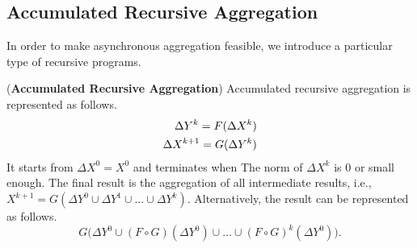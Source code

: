 \subsection{Accumulated Recursive Aggregation}
\label{sec:async:accrec}

In order to make asynchronous aggregation feasible, we introduce a particular type of recursive programs.

\begin{definition}
	\label{def:accumasync}
	(\textbf{Accumulated Recursive Aggregation}) Accumulated recursive aggregation is represented as follows.
	\begin{equation}\label{eq:accumasync}
	\begin{aligned}
	\Delta Y^{k}= F(\Delta X^k)\notag\\
	\Delta X^{k+1}= G(\Delta Y^{k})\notag
	\end{aligned}
	\end{equation}
	It starts from $\Delta X^0=X^0$ and terminates when The norm of $\Delta X^k$ is 0 or small enough. The final result is the aggregation of all intermediate results, i.e., $X^{k+1}=G(\Delta Y^{0} \cup \Delta Y^{1} \cup \ldots \cup \Delta Y^{k})$. Alternatively, the result can be represented as follows.
	\begin{equation}
	\label{eq:accumasyncres}
	G\Big(\Delta Y^0\cup (F\circ G)(\Delta Y^0)\cup\ldots\cup (F\circ G)^k(\Delta Y^0)\Big).
	\end{equation}
\end{definition}

